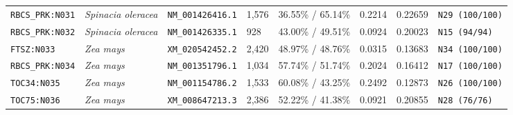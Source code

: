 \documentclass[10pt,letterpaper]{article}
\begin{document}
\begin{longtable}{llllllll}
\texttt{RBCS\_PRK:N031} & \textit{Spinacia oleracea} & \texttt{NM\_001426416.1} & 1,576 & 36.55\% / 65.14\% & 0.2214 & 0.22659 & \texttt{N29 (100/100)} \\
\texttt{RBCS\_PRK:N032} & \textit{Spinacia oleracea} & \texttt{NM\_001426335.1} & 928 & 43.00\% / 49.51\% & 0.0924 & 0.20023 & \texttt{N15 (94/94)} \\
\texttt{FTSZ:N033} & \textit{Zea mays} & \texttt{XM\_020542452.2} & 2,420 & 48.97\% / 48.76\% & 0.0315 & 0.13683 & \texttt{N34 (100/100)} \\
\texttt{RBCS\_PRK:N034} & \textit{Zea mays} & \texttt{NM\_001351796.1} & 1,034 & 57.74\% / 51.74\% & 0.2024 & 0.16412 & \texttt{N17 (100/100)} \\
\texttt{TOC34:N035} & \textit{Zea mays} & \texttt{NM\_001154786.2} & 1,533 & 60.08\% / 43.25\% & 0.2492 & 0.12873 & \texttt{N26 (100/100)} \\
\texttt{TOC75:N036} & \textit{Zea mays} & \texttt{XM\_008647213.3} & 2,386 & 52.22\% / 41.38\% & 0.0921 & 0.20855 & \texttt{N28 (76/76)} \\
\bottomrule
\end{longtable}
\end{document}

